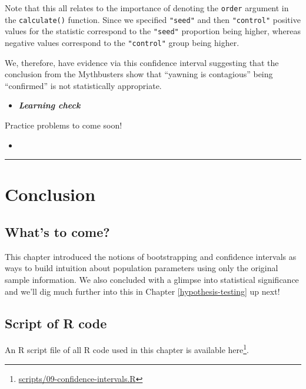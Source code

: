 \documentclass[12pt, krantz2,]{krantz}
\renewcommand{\href}[2]{#2\footnote{\url{#1}}}
\newenvironment{rmdblock}[1]
  {\begin{shaded*}
  \begin{itemize}
  \renewcommand{\labelitemi}{
    \raisebox{-.7\height}[0pt][0pt]{
    }
  }
  \item
  }
  {
  \end{itemize}
  \end{shaded*}
  }
\newenvironment{learncheck}
  {\begin{rmdblock}{warning}}
  {\end{rmdblock}}
\begin{document}
Note that this all relates to the importance of denoting the \texttt{order} argument in the \texttt{calculate()} function. Since we specified \texttt{"seed"} and then \texttt{"control"} positive values for the statistic correspond to the \texttt{"seed"} proportion being higher, whereas negative values correspond to the \texttt{"control"} group being higher.

We, therefore, have evidence via this confidence interval suggesting that the conclusion from the Mythbusters show that ``yawning is contagious'' being ``confirmed'' is not statistically appropriate.

\begin{learncheck}
\textbf{\emph{Learning check}}
\end{learncheck}

Practice problems to come soon!

\begin{learncheck}

\end{learncheck}

\begin{center}\rule{0.5\linewidth}{\linethickness}\end{center}

\hypertarget{conclusion-6}{%
\section{Conclusion}\label{conclusion-6}}

\hypertarget{whats-to-come-7}{%
\subsection{What's to come?}\label{whats-to-come-7}}

This chapter introduced the notions of bootstrapping and confidence intervals as ways to build intuition about population parameters using only the original sample information. We also concluded with a glimpse into statistical significance and we'll dig much further into this in Chapter \ref{hypothesis-testing} up next!

\hypertarget{script-of-r-code}{%
\subsection{Script of R code}\label{script-of-r-code}}

An R script file of all R code used in this chapter is available \href{scripts/09-confidence-intervals.R}{here}.
\end{document}
